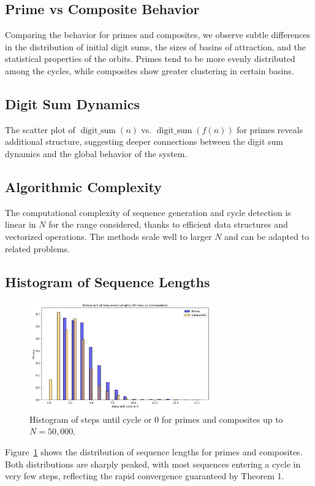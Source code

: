 \documentclass[12pt]{article}
\begin{document}
\subsection{Prime vs Composite Behavior}
Comparing the behavior for primes and composites, we observe subtle differences in the distribution of initial digit sums, the sizes of basins of attraction, and the statistical properties of the orbits. Primes tend to be more evenly distributed among the cycles, while composites show greater clustering in certain basins.

\subsection{Digit Sum Dynamics}
The scatter plot of $\operatorname{digit\_sum}(n)$ vs. $\operatorname{digit\_sum}(f(n))$ for primes reveals additional structure, suggesting deeper connections between the digit sum dynamics and the global behavior of the system.

\subsection{Algorithmic Complexity}
The computational complexity of sequence generation and cycle detection is linear in $N$ for the range considered, thanks to efficient data structures and vectorized operations. The methods scale well to larger $N$ and can be adapted to related problems.


\subsection{Histogram of Sequence Lengths}
\begin{figure}[H]
    \centering
    \includegraphics[width=0.7\textwidth]{fig_histogram_sequence_lengths.png}
    \caption{Histogram of steps until cycle or $0$ for primes and composites up to $N=50,000$.}
    \label{fig:histogram}
\end{figure}
Figure~\ref{fig:histogram} shows the distribution of sequence lengths for primes and composites. Both distributions are sharply peaked, with most sequences entering a cycle in very few steps, reflecting the rapid convergence guaranteed by Theorem 1.
\end{document}
